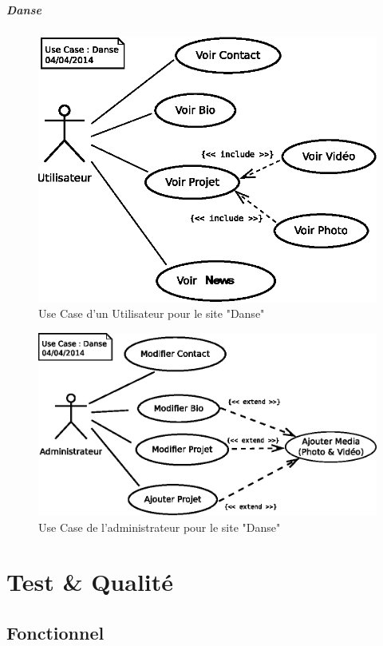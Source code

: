 \documentclass[11pt,a4paper]{report}
\begin{document}
					\subparagraph*{Danse}
						\begin{figure}[H]
							\centering
							\includegraphics[width=12cm]{UseCase-Danse-User.eps}
							\caption[Use Case Utilisateur Danse]{Use Case d'un Utilisateur pour le site "Danse"}
							\label{fig:UseCase-Danse User}
						\end{figure}
						\begin{figure}[H]
							\centering
							\includegraphics[width=16cm]{UseCase-Danse-Administrateur.eps}
							\caption[Use Case Administrateur Danse]{Use Case de l'administrateur pour le site "Danse"}
							\label{fig:UseCase-Danse Admin}
						\end{figure}
				\newpage
				
	\section{Test \& Qualité}
		\subsection{Fonctionnel}
\end{document}
